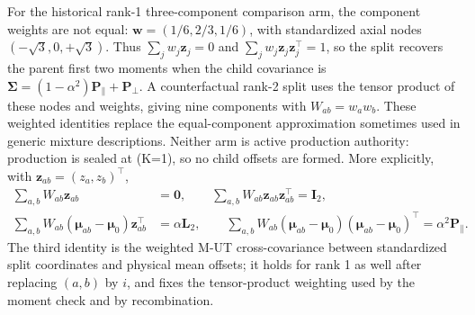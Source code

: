     For the historical rank-1 three-component comparison arm, the component weights are not equal:
    \(\boldsymbol{w}=(1/6,2/3,1/6)\), with standardized axial nodes
    \((-\sqrt{3},0,+\sqrt{3})\). Thus \(\sum_jw_j\boldsymbol{z}_j=0\) and
    \(\sum_jw_j\boldsymbol{z}_j\boldsymbol{z}_j^\top=1\), so the split recovers the
    parent first two moments when the child covariance is
    \(\boldsymbol{\Sigma}=(1-\alpha^2)\boldsymbol{P}_{\parallel}+\boldsymbol{P}_{\perp}\).
    A counterfactual rank-2 split uses the tensor product of these nodes and weights, giving nine
    components with \(W_{ab}=w_aw_b\). These weighted identities replace the
    equal-component approximation sometimes used in generic mixture descriptions. Neither arm is
    active production authority: production is sealed at (K=1), so no child offsets are formed.
    More explicitly, with \(\boldsymbol{z}_{ab}=(z_a,z_b)^\top\),
    \begin{align}
        \sum_{a,b}W_{ab}\boldsymbol{z}_{ab}&=\boldsymbol{0},\qquad
        \sum_{a,b}W_{ab}\boldsymbol{z}_{ab}\boldsymbol{z}_{ab}^{\top}=\boldsymbol{I}_2,\\
        \sum_{a,b}W_{ab}(\boldsymbol{\mu}_{ab}-\boldsymbol{\mu}_0)\boldsymbol{z}_{ab}^{\top}
        &=\alpha\boldsymbol{L}_2,\qquad
        \sum_{a,b}W_{ab}(\boldsymbol{\mu}_{ab}-\boldsymbol{\mu}_0)(\boldsymbol{\mu}_{ab}-\boldsymbol{\mu}_0)^{\top}
        =\alpha^2\boldsymbol{P}_{\parallel}.
    \end{align}
    The third identity is the weighted M-UT cross-covariance between standardized
    split coordinates and physical mean offsets; it holds for rank 1 as well after
    replacing \((a,b)\) by \(i\), and fixes the tensor-product weighting used by
    the moment check and by recombination.

